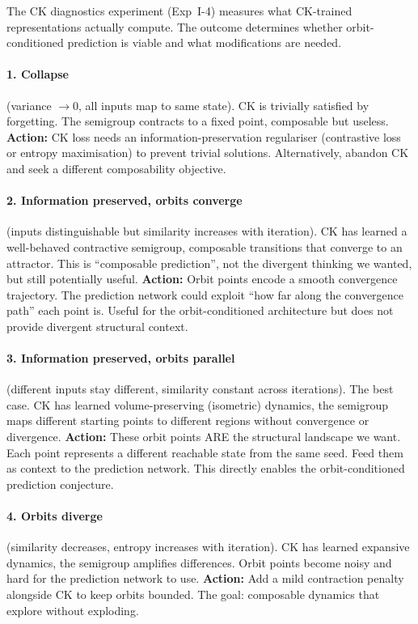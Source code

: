 \documentclass[11pt, a4paper]{article}
\theoremstyle{plain}
\theoremstyle{definition}
\theoremstyle{remark}
\begin{document}
The CK diagnostics experiment (Exp~I-4) measures what CK-trained representations actually compute.
The outcome determines whether orbit-conditioned prediction is viable and what modifications are needed.

\paragraph{1. Collapse} (variance $\to 0$, all inputs map to same state).
CK is trivially satisfied by forgetting.
The semigroup contracts to a fixed point, composable but useless.
\textbf{Action:} CK loss needs an information-preservation regulariser (contrastive loss or entropy maximisation) to prevent trivial solutions.
Alternatively, abandon CK and seek a different composability objective.

\paragraph{2. Information preserved, orbits converge} (inputs distinguishable but similarity increases with iteration).
CK has learned a well-behaved contractive semigroup, composable transitions that converge to an attractor.
This is ``composable prediction'', not the divergent thinking we wanted, but still potentially useful.
\textbf{Action:} Orbit points encode a smooth convergence trajectory.
The prediction network could exploit ``how far along the convergence path'' each point is.
Useful for the orbit-conditioned architecture but does not provide divergent structural context.

\paragraph{3. Information preserved, orbits parallel} (different inputs stay different, similarity constant across iterations).
The best case.
CK has learned volume-preserving (isometric) dynamics, the semigroup maps different starting points to different regions without convergence or divergence.
\textbf{Action:} These orbit points ARE the structural landscape we want.
Each point represents a different reachable state from the same seed.
Feed them as context to the prediction network.
This directly enables the orbit-conditioned prediction conjecture.

\paragraph{4. Orbits diverge} (similarity decreases, entropy increases with iteration).
CK has learned expansive dynamics, the semigroup amplifies differences.
Orbit points become noisy and hard for the prediction network to use.
\textbf{Action:} Add a mild contraction penalty alongside CK to keep orbits bounded.
The goal: composable dynamics that explore without exploding.
\end{document}
